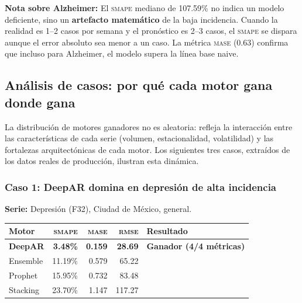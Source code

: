 \documentclass[12pt, letterpaper]{article}
\newenvironment{warningbox}[1][]{\par\medskip\begin{lrbox}{\boxcontents}\begin{minipage}{\dimexpr\textwidth-12pt}\setlength{\emergencystretch}{5em}\setlength{\parskip}{6pt}}{\end{minipage}\end{lrbox}\noindent\colorbox{lightyellow}{\usebox{\boxcontents}}\par\medskip}
\newcommand{\smape}{\textnormal{\textsc{smape}}}
\newcommand{\mase}{\textnormal{\textsc{mase}}}
\newcommand{\rmse}{\textnormal{\textsc{rmse}}}
\begin{document}
\begin{warningbox}
\textbf{Nota sobre Alzheimer:} El \smape{} mediano de 107.59\% no indica un modelo deficiente, sino un \textbf{artefacto matemático} de la baja incidencia. Cuando la realidad es 1--2 casos por semana y el pronóstico es 2--3 casos, el \smape{} se dispara aunque el error absoluto sea menor a un caso. La métrica \mase{} (0.63) confirma que incluso para Alzheimer, el modelo supera la línea base naive.
\end{warningbox}

\subsection{Análisis de casos: por qué cada motor gana donde gana}

La distribución de motores ganadores no es aleatoria: refleja la interacción entre las características de cada serie (volumen, estacionalidad, volatilidad) y las fortalezas arquitectónicas de cada motor. Los siguientes tres casos, extraídos de los datos reales de producción, ilustran esta dinámica.

\subsubsection{Caso 1: DeepAR domina en depresión de alta incidencia}

\textbf{Serie:} Depresión (F32), Ciudad de México, general.

\begin{table}[H]
\centering
\small
\begin{tabularx}{\textwidth}{X r r r l}
\toprule
\textbf{Motor} & \textbf{\smape{}} & \textbf{\mase{}} & \textbf{\rmse{}} & \textbf{Resultado} \\
\midrule
\rowcolor{lightgreen} \textbf{DeepAR} & \textbf{3.48\%} & \textbf{0.159} & \textbf{28.69} & \textbf{Ganador (4/4 métricas)} \\
Ensemble & 11.19\% & 0.579 & 65.22 & \\
Prophet & 15.95\% & 0.732 & 83.48 & \\
Stacking & 23.70\% & 1.147 & 117.27 & \\
\bottomrule
\end{tabularx}
\end{table}
\end{document}
